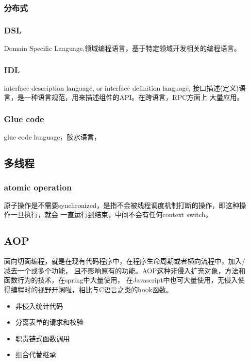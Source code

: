 \subsubsection{分布式}

\subsubsection{DSL}
Domain Specific Language,领域编程语言，基于特定领域开发相关的编程语言。

\subsubsection{IDL}
interface description language, or interface definition language,
接口描述(定义)语言，是一种语言规范，用来描述组件的API。在跨语言，RPC方面上
大量应用。

\subsubsection{Glue code}
glue code language，胶水语言，

\subsection{多线程}

\subsubsection{atomic operation}
原子操作是不需要synchronized，是指不会被线程调度机制打断的操作，即这种操作一旦执行，就会
一直运行到结束，中间不会有任何context switch。

\subsection{AOP}
面向切面编程，就是在现有代码程序中，在程序生命周期或者横向流程中，加入/减去一个或多个功能，
且不影响原有的功能。AOP这种非侵入扩充对象，方法和函数行为的技术，在spring中大量使用，
在Javascript中也可大量使用，无侵入使得编程时的视野开阔啦，相比与C语言之类的hook函数。
\begin{itemize}
    \item {非侵入统计代码}
    \item {分离表单的请求和校验}
    \item {职责链式函数调用}
    \item {组合代替继承}
\end{itemize}


